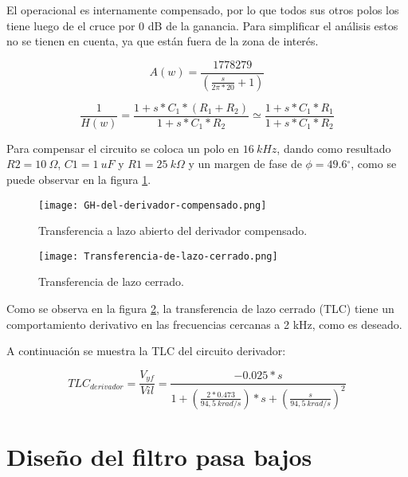 \noindent El operacional es internamente compensado, por lo que todos sus otros polos los tiene luego de el cruce por 0 dB de la ganancia. Para simplificar el an\'{a}lisis estos no se tienen en cuenta, ya que est\'{a}n fuera de la zona de inter\'{e}s.

\begin{equation} \label{eq_Aw_1}
	A(w)=\frac{1778279}{(\frac{s}{2\pi *20}+1)}
\end{equation} 

\begin{equation} \label{eq_Aw_2}
	\frac{1}{H(w)}=\frac{1+s*C_1*(R_1+R_2)}{1+s*C_1*R_2}\simeq \frac{1+s*C_1*R_1}{1+s*C_1*R_2}
\end{equation}

\noindent Para compensar el circuito se coloca un polo en $16 \:kHz$, dando como resultado $R2=10\:\Omega$, $C1=1\:uF$ y $R1=25\: k\Omega$ y un margen de fase de $\phi =49.6{}^\circ $, como se puede observar en la figura \ref{fig:img_GH del derivador compensado}.

\begin{figure}[H]
	\centering
	\texttt{[image: GH-del-derivador-compensado.png]}
	\caption{Transferencia a lazo abierto del derivador compensado.}
	\label{fig:img_GH del derivador compensado}
\end{figure}

\begin{figure}[H]
	\centering
	\texttt{[image: Transferencia-de-lazo-cerrado.png]}
	\caption{Transferencia de lazo cerrado.}
	\label{fig:img_Transferencia-de-lazo-cerrado}
\end{figure}

\noindent Como se observa en la figura \ref{fig:img_Transferencia-de-lazo-cerrado}, la transferencia de lazo cerrado (TLC) tiene un comportamiento derivativo en las frecuencias cercanas a 2 kHz, como es deseado.

\noindent A continuaci\'{o}n se muestra la TLC del circuito derivador:
 
\begin{equation} \label{eq_Vyf-lineal}
	{TLC}_{derivador}=\frac{V_{yf}}{Vil}=\frac{-0.025*s}{1+(\frac{2*0.473}{94,5\ krad/s})*s+(\frac{s}{94,5\ krad/s})^2}
\end{equation} 

\section{Dise\~{n}o del filtro pasa bajos}

